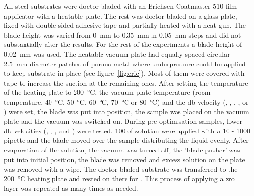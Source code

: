 All steel substrates 
were doctor bladed with 
an Erichsen Coatmaster 510 film applicator with a heatable plate.
The rest was doctor bladed on a glass plate, fixed with double sided adhesive tape and 
partially heated with a heat gun.
The blade height was varied from \SI{0}{\milli\meter} to \SI{0.35}{\milli\meter} in 
\SI{0.05}{\milli\meter} steps and did not substantially alter the results.
For the rest of the experiments a blade height of \SI{0.02}{\milli\meter} was used.
The heatable vacuum plate 
had equally spaced circular \SI{2.5}{\milli\meter} diameter patches of porous metal where 
underpressure could be applied to keep substrate in place (see 
figure~\ref{fig:eric}). Most of them were covered with tape to increase the suction at the remaining ones. After setting the temperature of the heating plate to 
\SI{200}{\celsius}, the vacuum plate temperature (room temperature, \SI{40}{\celsius}, 
\SI{50}{\celsius}, \SI{60}{\celsius}, \SI{70}{\celsius} or \SI{80}{\celsius}) and the 
\gls{db} velocity (, , , ,  or ) were set, 
the blade was put into position, the sample was placed on the vacuum plate and the vacuum 
was switched on. 
During pre-optimisation samples, lower \gls{db} velocities (, , 
,  and ) were tested. 
\ul{100} of solution were 
applied with a 10 - \ul{1000} pipette and the blade moved over the sample distributing the 
liquid evenly. After evaporation of the solution, the vacuum was turned off, the 'blade 
pusher' was put into initial position, the blade was removed and excess solution on the plate 
was removed with a 
wipe. The doctor bladed substrate was transferred to the \SI{200}{\celsius} heating plate and 
rested on there for . 
This process of applying a \gls{zro} layer was repeated as many times as needed.
